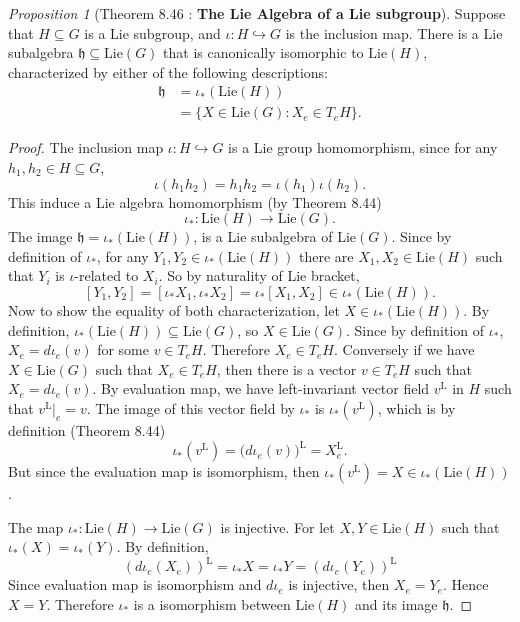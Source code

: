 \documentclass[a4paper]{article}
\theoremstyle{remark}
\newtheorem{prop}{Proposition}
\newcommand{\subhim}{\subseteq} %
\newcommand{\hlie}{\mathfrak{h}} %
\newcommand{\Ltegak}{\text{L}} %
\newcommand{\Lie}{\text{Lie}} %
\newcommand{\LieG}{\text{Lie}(G)} %
\begin{document}
\begin{prop}[Theorem 8.46 : \textbf{The Lie Algebra of a Lie subgroup}]
Suppose that $H \subhim G$ is a Lie subgroup, and $\iota : H \hookrightarrow G$ is the inclusion map.
There is a Lie subalgebra $\mathfrak{h} \subhim \LieG$ that is canonically isomorphic to $\Lie(H)$, characterized by either of the following descriptions:
\begin{align*}
\mathfrak{h} &= \iota_* (\Lie(H)) \\
&=\{ X \in \LieG : X_e \in T_eH  \}.
\end{align*}
\end{prop}
\begin{proof}
The inclusion map $\iota : H \hookrightarrow G$ is a Lie group homomorphism, since for any $h_1,h_2 \in H \subhim G$,
$$
\iota(h_1h_2) = h_1 h_2 = \iota(h_1)\iota(h_2).  
$$
This induce a Lie algebra homomorphism (by Theorem 8.44) 
$$
\iota_* : \Lie(H) \to \LieG.
$$
The image $\hlie = \iota_*(\Lie(H))$, is a Lie subalgebra of $\LieG$. Since by definition of $\iota_*$, for any $Y_1,Y_2 \in \iota_*(\Lie(H))$ there are $X_1,X_2 \in \Lie(H)$ such that $Y_i$ is $\iota$-related to $X_i$. So by naturality of Lie bracket,
$$
[Y_1,Y_2] = [\iota_*X_1,\iota_*X_2] = \iota_*[X_1,X_2] \in \iota_*(\Lie(H)).
$$ 
Now to show the equality of both characterization, let $X \in \iota_*(\Lie(H))$. By definition, $\iota_*(\Lie(H)) \subhim \LieG$, so $X \in \LieG$. Since by definition of $\iota_*$, $X_e = d\iota_e(v)$ for some $v \in T_eH$. Therefore $X_e \in T_eH$. Conversely if we have $X \in \LieG$ such that $X_e \in T_e H$, then there is a vector $v \in T_eH$ such that $X_e = d\iota_e(v)$. By evaluation map, we have left-invariant vector field $v^{\Ltegak}$ in $H$ such that $v^{\Ltegak}|_e = v$. The image of this vector field by $\iota_*$ is $\iota_*(v^{\Ltegak})$, which is by definition (Theorem 8.44) 
$$
\iota_*(v^{\Ltegak}) = \big(d\iota_e(v)\big)^{\Ltegak} = X_e^{\Ltegak}.
$$
But since the evaluation map is isomorphism, then $\iota_*(v^{\Ltegak}) = X \in \iota_*(\Lie(H))$.

The map $\iota_* : \Lie(H) \to \LieG$ is injective. For let $X,Y \in \Lie(H)$ such that $\iota_*(X) = \iota_*(Y)$. By definition, 
$$
(d\iota_e(X_e))^{\Ltegak} = \iota_*X = \iota_*Y = (d\iota_e(Y_e))^{\Ltegak}
$$
Since evaluation map is isomorphism and $d\iota_e$ is injective, then $X_e = Y_e$. Hence $X=Y$. Therefore $\iota_*$ is a isomorphism between $\Lie(H)$ and its image $\hlie$.
\end{proof}
\end{document}
